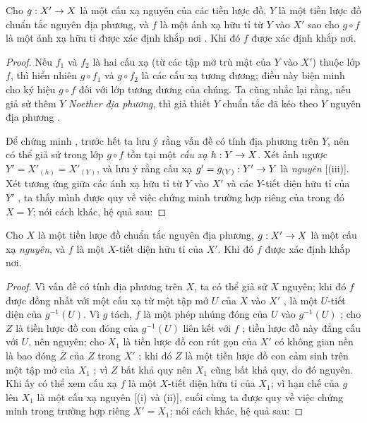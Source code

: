 \documentclass[oneside,10pt]{amsart}
\makeatletter
\newcommand{\ega@arrow}[2]{\mathchoice{#1}{#2}{#2}{#2}}
\renewcommand{\to}{\ega@arrow{\longrightarrow}{\rightarrow}}
\let\EGAOriginalLabel\label
\renewcommand{\label}[1]{\phantomsection\EGAOriginalLabel{#1}}
\makeatother
\begin{document}
\begin{proposition}[6.1.13]
\label{II.6.1.13}
Cho $g:X'\to X$ là một cấu xạ nguyên của các tiền lược đồ, $Y$ là một tiền lược đồ chuẩn tắc nguyên địa phương, và $f$ là một ánh xạ hữu tỉ từ $Y$ vào $X'$ sao cho $g\circ f$ là một ánh xạ hữu tỉ được xác định khắp nơi .
Khi đó $f$ được xác định khắp nơi.
\end{proposition}

\begin{proof}
Nếu $f_1$ và $f_2$ là hai cấu xạ (từ các tập mở trù mật của $Y$ vào $X'$) thuộc lớp $f$, thì hiển nhiên $g\circ f_1$ và $g\circ f_2$ là các cấu xạ tương đương; điều này biện minh cho ký hiệu $g\circ f$ đối với lớp tương đương của chúng.
Ta cũng nhắc lại rằng, nếu giả sử thêm $Y$ \emph{Noether địa phương}, thì giả thiết $Y$ chuẩn tắc đã kéo theo $Y$ nguyên địa phương .

Để chứng minh , trước hết ta lưu ý rằng vấn đề có tính địa phương trên $Y$, nên có thể giả sử trong lớp $g\circ f$ tồn tại một \emph{cấu xạ} $h:Y\to X$.
Xét ảnh ngược $Y'=X'_{(h)}=X'_{(Y)}$, và lưu ý rằng cấu xạ $g'=g_{(Y)}:Y'\to Y$ là \emph{nguyên} [(iii)].
Xét tương ứng giữa các ánh xạ hữu tỉ từ $Y$ vào $X'$ và các $Y$-tiết diện hữu tỉ của $Y'$ , ta thấy mình được quy về việc chứng minh trường hợp riêng của  trong đó $X=Y$; nói cách khác, hệ quả sau:
\end{proof}

\begin{corollary}[6.1.14]
\label{II.6.1.14}
Cho $X$ là một tiền lược đồ chuẩn tắc nguyên địa phương, $g:X'\to X$ là một cấu xạ \emph{nguyên}, và $f$ là một $X$-tiết diện hữu tỉ của $X'$.
Khi đó $f$ được xác định khắp nơi.
\end{corollary}

\begin{proof}
Vì vấn đề có tính địa phương trên $X$, ta có thể giả sử $X$ nguyên; khi đó $f$ được đồng nhất với một cấu xạ từ một tập mở $U$ của $X$ vào $X'$ , là một $U$-tiết diện của $g^{-1}(U)$.
Vì $g$ tách, $f$ là một phép nhúng đóng của $U$ vào $g^{-1}(U)$ ;
cho $Z$ là tiền lược đồ con đóng của $g^{-1}(U)$ liên kết với $f$ ; tiền lược đồ này đẳng cấu với $U$, nên nguyên;
cho $X_1$ là tiền lược đồ con rút gọn của $X'$ có không gian nền là bao đóng $\overline{Z}$ của $Z$ trong $X'$ ;
khi đó $Z$ là một tiền lược đồ con cảm sinh trên một tập mở của $X_1$ ; vì $Z$ bất khả quy nên $X_1$ cũng bất khả quy, do đó nguyên.
Khi ấy có thể xem cấu xạ $f$ là một $X$-tiết diện hữu tỉ của $X_1$;
vì hạn chế của $g$ lên $X_1$ là một cấu xạ nguyên [(i) và (ii)], cuối cùng ta được quy về việc chứng minh  trong trường hợp riêng $X'=X_1$; nói cách khác, hệ quả sau:
\end{proof}
\end{document}
